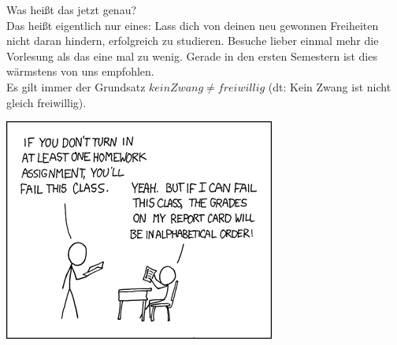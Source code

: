 	Was heißt das jetzt genau? \\
	Das heißt eigentlich nur eines: Lass dich von deinen neu gewonnen Freiheiten nicht daran hindern, erfolgreich zu studieren. Besuche lieber einmal mehr die Vorlesung als das eine mal zu wenig. Gerade in den ersten Semestern ist dies wärmstens von uns empfohlen. \\
	Es gilt immer der Grundsatz $ kein Zwang \neq freiwillig $ (dt: Kein Zwang ist nicht gleich freiwillig).
	
\begin{center}
\includegraphics[totalheight=6cm]{bilder/XKCD/priorities}
\end{center}

